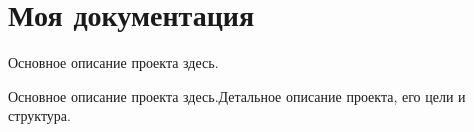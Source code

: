 \chapter{Моя документация}
\hypertarget{index}{}\label{index}
Основное описание проекта здесь.

Основное описание проекта здесь.\+Детальное описание проекта, его цели и структура. 